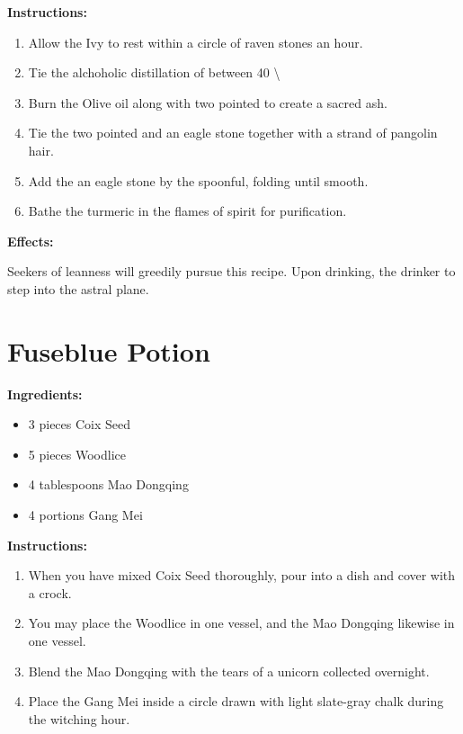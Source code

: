 \documentclass{article}
\begin{document}
\textbf{Instructions:}

\begin{enumerate}
  \item Allow the Ivy to rest within a circle of raven stones an hour.
  \item Tie the alchoholic distillation of between 40 \textbackslash{}%
  \item Burn the Olive oil along with two pointed to create a sacred ash.
  \item Tie the two pointed and an eagle stone together with a strand of pangolin hair.
  \item Add the an eagle stone by the spoonful, folding until smooth.
  \item Bathe the turmeric in the flames of spirit for purification.
\end{enumerate}

\textbf{Effects:}

Seekers of leanness will greedily pursue this recipe. Upon drinking, the drinker to step into the astral plane.

\newpage
\section*{Fuseblue Potion}

\textbf{Ingredients:}

\begin{itemize}
  \item 3 pieces Coix Seed
  \item 5 pieces Woodlice
  \item 4 tablespoons Mao Dongqing
  \item 4 portions Gang Mei
\end{itemize}

\textbf{Instructions:}

\begin{enumerate}
  \item When you have mixed Coix Seed thoroughly, pour into a dish and cover with a crock.
  \item You may place the Woodlice in one vessel, and the Mao Dongqing likewise in one vessel.
  \item Blend the Mao Dongqing with the tears of a unicorn collected overnight.
  \item Place the Gang Mei inside a circle drawn with light slate-gray chalk during the witching hour.
\end{enumerate}
\end{document}
